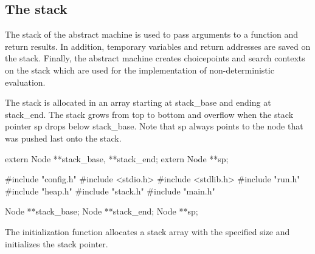 %
%
\subsection{The stack}
The stack of the abstract machine is used to pass arguments to a
function and return results. In addition, temporary variables and
return addresses are saved on the stack. Finally, the abstract machine
creates choicepoints and search contexts on the stack which are used
for the implementation of non-deterministic evaluation.

The stack is allocated in an array starting at {\Tt{}stack{\_}base\nwendquote} and
ending at {\Tt{}stack{\_}end\nwendquote}. The stack grows from top to bottom and
overflow when the stack pointer {\Tt{}sp\nwendquote} drops below {\Tt{}stack{\_}base\nwendquote}.
Note that {\Tt{}sp\nwendquote} always points to the node that was pushed last onto
the stack.

\nwenddocs{}\endmoddef\nwstartdeflinemarkup{}\nwenddeflinemarkup
extern Node **stack_base, **stack_end;
extern Node **sp;

\nwendcode{}\nwdocspar
\nwenddocs{}\endmoddef\nwstartdeflinemarkup{}\nwenddeflinemarkup
#include "config.h"
#include <stdio.h>
#include <stdlib.h>
#include "run.h"
#include "heap.h"
#include "stack.h"
#include "main.h"

Node **stack_base;
Node **stack_end;
Node **sp;

\nwendcode{}\nwdocspar
The initialization function allocates a stack array with the specified
size and initializes the stack pointer.

